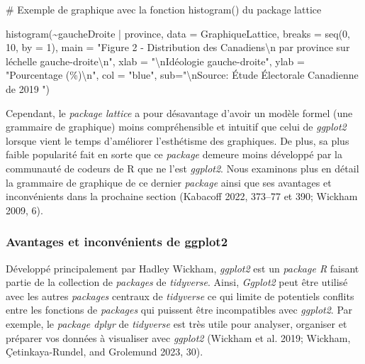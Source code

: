 \documentclass[
  letterpaper,
]{scrbook}
\newenvironment{Shaded}{\begin{snugshade}}{\end{snugshade}}
\newcommand{\AttributeTok}[1]{\textcolor[rgb]{0.40,0.45,0.13}{#1}}
\newcommand{\CommentTok}[1]{\textcolor[rgb]{0.37,0.37,0.37}{#1}}
\newcommand{\DecValTok}[1]{\textcolor[rgb]{0.68,0.00,0.00}{#1}}
\newcommand{\FunctionTok}[1]{\textcolor[rgb]{0.28,0.35,0.67}{#1}}
\newcommand{\NormalTok}[1]{\textcolor[rgb]{0.00,0.23,0.31}{#1}}
\newcommand{\SpecialCharTok}[1]{\textcolor[rgb]{0.37,0.37,0.37}{#1}}
\newcommand{\StringTok}[1]{\textcolor[rgb]{0.13,0.47,0.30}{#1}}
\begin{document}
\begin{Shaded}
\begin{Highlighting}[]
\CommentTok{\# Exemple de graphique avec la fonction histogram() du package lattice}

\FunctionTok{histogram}\NormalTok{(}\SpecialCharTok{\textasciitilde{}}\NormalTok{gaucheDroite }\SpecialCharTok{|}\NormalTok{ province, }\AttributeTok{data =}\NormalTok{ GraphiqueLattice, }\AttributeTok{breaks =} \FunctionTok{seq}\NormalTok{(}\DecValTok{0}\NormalTok{, }\DecValTok{10}\NormalTok{, }
  \AttributeTok{by =} \DecValTok{1}\NormalTok{), }
  \AttributeTok{main =} \StringTok{"Figure 2 {-} Distribution des Canadiens}\SpecialCharTok{\textbackslash{}n}\StringTok{ par province sur l\textquotesingle{}échelle gauche{-}droite}\SpecialCharTok{\textbackslash{}n}\StringTok{"}\NormalTok{,}
  \AttributeTok{xlab =} \StringTok{"}\SpecialCharTok{\textbackslash{}n}\StringTok{Idéologie gauche{-}droite"}\NormalTok{,}
  \AttributeTok{ylab =} \StringTok{"Pourcentage (\%)}\SpecialCharTok{\textbackslash{}n}\StringTok{"}\NormalTok{,}
  \AttributeTok{col  =} \StringTok{"blue"}\NormalTok{,}
  \AttributeTok{sub=}\StringTok{"}\SpecialCharTok{\textbackslash{}n}\StringTok{Source: Étude Électorale Canadienne de 2019                                                "}\NormalTok{)}
\end{Highlighting}
\end{Shaded}

Cependant, le \emph{package lattice} a pour désavantage d'avoir un
modèle formel (une grammaire de graphique) moins compréhensible et
intuitif que celui de \emph{ggplot2} lorsque vient le temps d'améliorer
l'esthétisme des graphiques. De plus, sa plus faible popularité fait en
sorte que ce \emph{package} demeure moins développé par la communauté de
codeurs de R que ne l'est \emph{ggplot2}. Nous examinons plus en détail
la grammaire de graphique de ce dernier \emph{package} ainsi que ses
avantages et inconvénients dans la prochaine section (Kabacoff 2022,
373--77 et 390; Wickham 2009, 6).

\hypertarget{avantages-et-inconvuxe9nients-de-ggplot2}{%
\subsubsection{Avantages et inconvénients de
ggplot2}\label{avantages-et-inconvuxe9nients-de-ggplot2}}

Développé principalement par Hadley Wickham, \emph{ggplot2} est un
\emph{package R} faisant partie de la collection de \emph{packages} de
\emph{tidyverse}. Ainsi, \emph{Ggplot2} peut être utilisé avec les
autres \emph{packages} centraux de \emph{tidyverse} ce qui limite de
potentiels conflits entre les fonctions de \emph{packages} qui puissent
être incompatibles avec \emph{ggplot2}. Par exemple, le \emph{package
dplyr} de \emph{tidyverse} est très utile pour analyser, organiser et
préparer vos données à visualiser avec \emph{ggplot2} (Wickham et al.
2019; Wickham, Çetinkaya-Rundel, and Grolemund 2023, 30).
\end{document}
